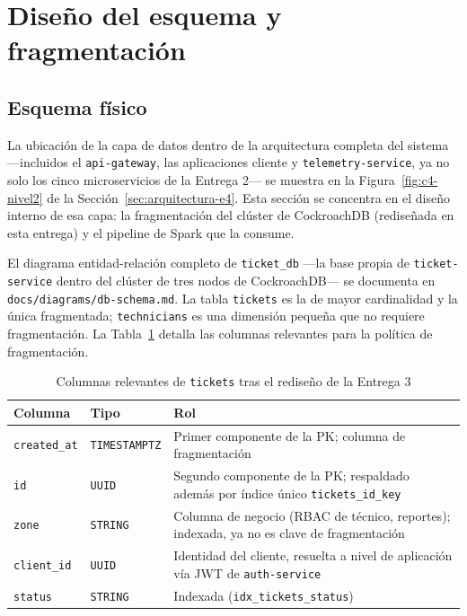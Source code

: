 \section{Diseño del esquema y fragmentación}
\label{sec:diseno-esquema}

\subsection{Esquema físico}

La ubicación de la capa de datos dentro de la arquitectura completa del sistema —incluidos el
\texttt{api-gateway}, las aplicaciones cliente y \texttt{telemetry-service}, ya no solo los cinco
microservicios de la Entrega 2— se muestra en la Figura~\ref{fig:c4-nivel2} de la
Sección~\ref{sec:arquitectura-e4}. Esta sección se concentra en el diseño interno de esa capa: la
fragmentación del clúster de CockroachDB (rediseñada en esta entrega) y el pipeline de Spark que
la consume.

El diagrama entidad-relación completo de \texttt{ticket\_db} —la base propia de
\texttt{ticket-service} dentro del clúster de tres nodos de CockroachDB— se documenta en
\texttt{docs/diagrams/db-schema.md}. La tabla \texttt{tickets} es la de mayor cardinalidad y la
única fragmentada; \texttt{technicians} es una dimensión pequeña que no requiere fragmentación. La
Tabla~\ref{tab:esquema-tickets} detalla las columnas relevantes para la política de fragmentación.

\begin{table}[H]
\centering
\caption{Columnas relevantes de \texttt{tickets} tras el rediseño de la Entrega 3}
\label{tab:esquema-tickets}
\begin{tabular}{@{}llp{6.5cm}@{}}
\toprule
\textbf{Columna} & \textbf{Tipo} & \textbf{Rol} \\
\midrule
\texttt{created\_at} & \texttt{TIMESTAMPTZ} & Primer componente de la PK; columna de fragmentación \\
\texttt{id}           & \texttt{UUID}        & Segundo componente de la PK; respaldado además por índice único \texttt{tickets\_id\_key} \\
\texttt{zone}         & \texttt{STRING}      & Columna de negocio (RBAC de técnico, reportes); indexada, ya no es clave de fragmentación \\
\texttt{client\_id}   & \texttt{UUID}        & Identidad del cliente, resuelta a nivel de aplicación vía JWT de \texttt{auth-service} \\
\texttt{status}       & \texttt{STRING}      & Indexada (\texttt{idx\_tickets\_status}) \\
\bottomrule
\end{tabular}
\end{table}

